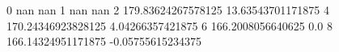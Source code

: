 0 nan nan
1 nan nan
2 179.83624267578125 13.63543701171875
4 170.24346923828125 4.04266357421875
6 166.2008056640625 0.0
8 166.14324951171875 -0.05755615234375
